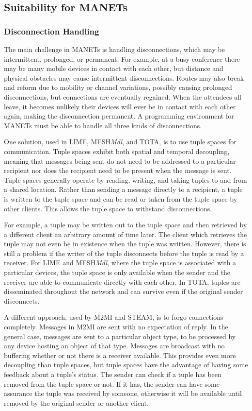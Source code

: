 \subsection{Suitability for MANETs}

\subsubsection{Disconnection Handling}

The main challenge in MANETs is handling disconnections, which may be intermittent, prolonged, or permanent. For example, at a busy conference there may be many mobile devices in contact with each other, but distance and physical obstacles may cause intermittent disconnections. Routes may also break and reform due to mobility or channel variations, possibly causing prolonged disconnections, but connections are eventually regained. When the attendees all leave, it becomes unlikely their devices will ever be in contact with each other again, making the disconnection permanent. A programming environment for MANETs must be able to handle all three kinds of disconnections.

One solution, used in LIME, MESH\textit{Mdl}, and TOTA, is to use tuple spaces for communication. Tuple spaces exhibit both spatial and temporal decoupling, meaning that messages being sent do not need to be addressed to a particular recipient nor does the recipient need to be present when the message is sent. Tuple spaces generally operate by reading, writing, and taking tuples to and from a shared location. Rather than sending a message directly to a recipient, a tuple is written to the tuple space and can be read or taken from the tuple space by other clients. This allows the tuple space to withstand disconnections.

For example, a tuple may be written out to the tuple space and then retrieved by a different client an arbitrary amount of time later. The client which retrieves the tuple may not even be in existence when the tuple was written. However, there is still a problem if the writer of the tuple disconnects before the tuple is read by a receiver. For LIME and MESH\textit{Mdl}, where the tuple space is associated with a particular devices, the tuple space is only available when the sender and the receiver are able to communicate directly with each other. In TOTA, tuples are disseminated throughout the network and can survive even if the original sender disconnects.

A different approach, used by M2MI and STEAM, is to forgo connections completely. Messages in M2MI are sent with no expectation of reply. In the general case, messages are sent to a particular object type, to be processed by any device hosting an object of that type. Messages are broadcast with no buffering whether or not there is a receiver available. This provides even more decoupling than tuple spaces, but tuple spaces have the advantage of having some feedback about a tuple's status. The sender can check if a tuple has been removed from the tuple space or not. If it has, the sender can have some assurance the tuple was received by someone, otherwise it will be available until removed by the original sender or another client.

